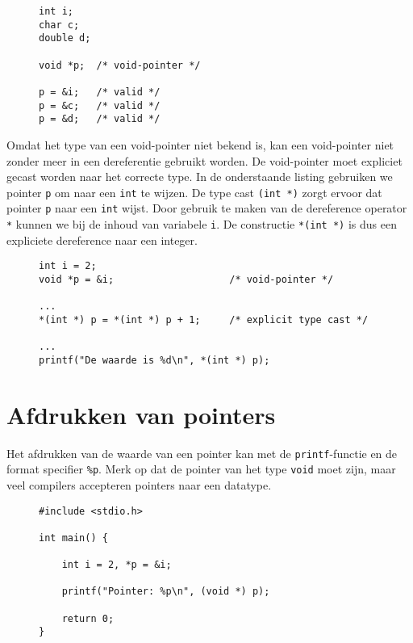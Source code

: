 \begin{figure}[!ht]
\begin{lstlisting}[caption=Declaratie en initialisatie van een void-pointer.]
int i;
char c;
double d;

void *p;  /* void-pointer */

p = &i;   /* valid */
p = &c;   /* valid */
p = &d;   /* valid */
\end{lstlisting}
\end{figure}

Omdat het type van een void-pointer niet bekend is, kan een void-pointer niet zonder meer in een dereferentie gebruikt worden. De void-pointer moet expliciet gecast worden naar het correcte type. In de onderstaande listing gebruiken we pointer \texttt{p} om naar een \texttt{int} te wijzen. De type cast \texttt{(int *)} zorgt ervoor dat pointer \texttt{p} naar een \texttt{int} wijst. Door gebruik te maken van de dereference operator \texttt{*} kunnen we bij de inhoud van variabele \texttt{i}. De constructie \texttt{*(int *)} is dus een expliciete dereference naar een integer.

\begin{figure}[!ht]
\begin{lstlisting}[caption={Declaratie, initialisatie en deference van een void-pointer.}]
int i = 2;
void *p = &i;                    /* void-pointer */

...
*(int *) p = *(int *) p + 1;     /* explicit type cast */

...
printf("De waarde is %d\n", *(int *) p);
\end{lstlisting}
\end{figure}


\section{Afdrukken van pointers}
\label{sec:afdrukkenvanpointers}
Het afdrukken van de waarde van een pointer kan met de \texttt{printf}-functie en de format specifier \texttt{\%p}. Merk op dat de pointer van het type \texttt{void} moet zijn, maar veel compilers accepteren pointers naar een datatype.

\begin{figure}[!ht]
\begin{lstlisting}[caption=Afdrukken van een pointer.]
#include <stdio.h>

int main() {

    int i = 2, *p = &i;

    printf("Pointer: %p\n", (void *) p);

    return 0;
}
\end{lstlisting}
\end{figure}

